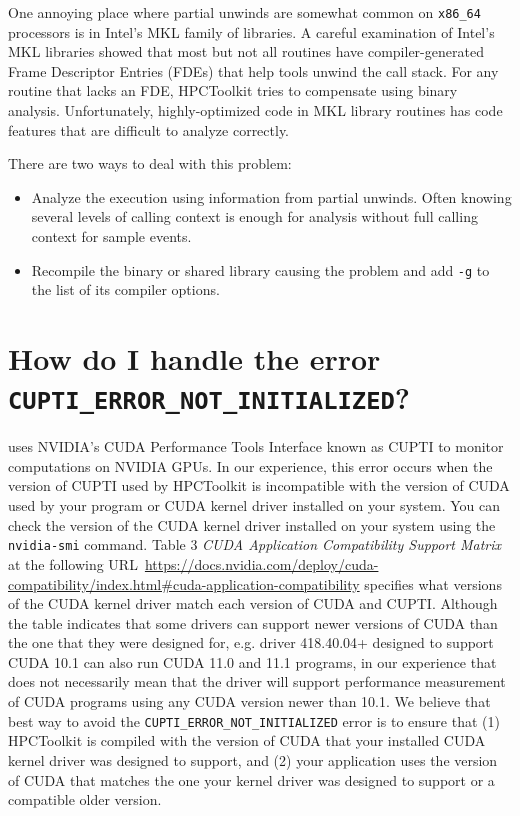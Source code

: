 \documentclass[11pt,letterpaper]{report}
\begin{document}
One annoying place where partial unwinds are somewhat common on \verb|x86_64| 
processors is in Intel's MKL family of libraries.  A careful examination of Intel’s
MKL libraries showed that most but not all routines have
compiler-generated Frame Descriptor Entries (FDEs) that help tools 
unwind the call stack.  For any routine that lacks
an FDE, HPCToolkit tries to compensate using binary analysis.  
Unfortunately, highly-optimized code in MKL library
routines has code features that are difficult to analyze correctly.

There are two ways to deal with this problem:
\begin{itemize}
\item Analyze the execution using information from partial unwinds. Often knowing several levels of calling context is enough for analysis without full calling context for sample events.
\item 
Recompile the binary or shared library causing the problem and add \verb|-g| to the list of its compiler options.
\end{itemize}

\section{How do I handle the error \texttt{CUPTI\_ERROR\_NOT\_INITIALIZED}?}
\label{sec:troubleshooting:cupti}

\hpcrun{} uses NVIDIA's CUDA Performance Tools Interface known as
CUPTI to monitor computations on NVIDIA GPUs. In our experience,
this error occurs when the version of CUPTI used by HPCToolkit is
incompatible with the version of CUDA used by your program or CUDA kernel driver installed on your system. You can check the
version of the CUDA kernel driver installed on your system using the {\tt nvidia-smi} command. 
Table 3 {\em CUDA Application Compatibility Support Matrix} at the following URL~\url{https://docs.nvidia.com/deploy/cuda-compatibility/index.html\#cuda-application-compatibility} 
specifies what versions of the CUDA kernel driver match each version of CUDA and CUPTI. 
Although the table indicates that some drivers can support newer versions of CUDA than the one that they were designed for, 
e.g. driver 418.40.04+ designed to support CUDA 10.1 can also run CUDA 11.0 and 11.1 programs, 
in our experience that does not necessarily mean that the driver will support performance measurement of CUDA programs 
using any CUDA version newer than 10.1.
We believe that best way to avoid the \texttt{CUPTI\_ERROR\_NOT\_INITIALIZED} error is to ensure that 
(1) HPCToolkit is compiled with the version of CUDA that your installed CUDA kernel driver was designed to support, and 
(2) your application uses the version of CUDA that matches the one your kernel driver was designed to support or a compatible older version.
\end{document}
